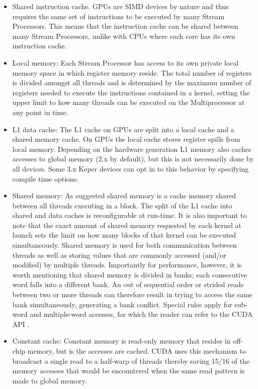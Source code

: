 \begin{itemize}
 \item Shared instruction cache. GPUs are SIMD devices by nature and thus requires the same set of instructions to be executed
 by many Stream Processors. This means that the instruction cache can be shared between many Stream Processors, unlike with CPUs
 where each core has its own instruction cache.
 \item Local memory: Each Stream Processor has access to its own private local memory space in which register memory reside. The total number of
 registers is divided amongst all threads and is determined by the maximum number of registers needed to execute the instructions contained in a 
 kernel, setting the upper limit to how many threads can be executed on the Multiprocessor at any point in time. 
 \item L1 data cache: The L1 cache on GPUs are split into a local cache and a shared memory cache. On GPUs the local cache stores register 
 spills from local memory. Depending on the hardware generation L1 memory also caches accesses to global memory (2.x by default), but this is
 not necessarily done by all devices. Some 3.x Keper devices can opt in to this behavior by specifying compile time options.
 \item Shared memory: As suggested shared memory is a cache memory shared between all threads executing in a block. The split of the L1 cache into
 shared and data caches is reconfigurable at run-time. It is also important to note that the exact amount of shared memory requested by each kernel at 
 launch sets the limit on how many blocks of that kernel can be executed simultaneously. Shared memory is used for both communication between threads as well
 as storing values that are commonly accessed (and/or modified) by multiple threads. Importantly for performance, however, it is worth mentioning that
 shared memory is divided in banks; each consecutive word falls into a different bank. An out of sequential order or strided reads between two or more threads
 can therefore result in trying to access the same bank simultaneously, generating a bank conflict. Special rules apply for sub-word and multiple-word accesses, for
 which the reader can refer to the CUDA API \cite[Section G: Compute Capabilities]{cuda}.
 \item Constant cache: Constant memory is read-only memory that resides in off-chip memory, but is the accesses are cached. CUDA uses this mechanism to broadcast
 a single read to a half-warp of threads thereby saving 15/16 of the memory accesses that would be encountered when the same read pattern is made to global memory.

\end{itemize}
